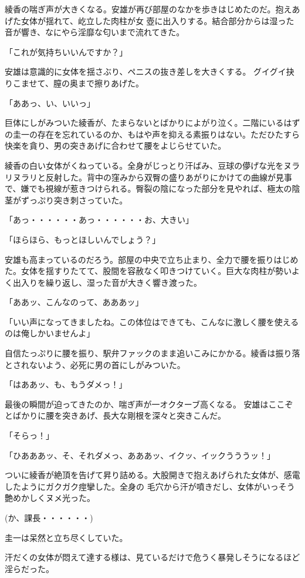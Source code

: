 ﻿\documentclass[book,tate]{jlreq}
\begin{document}
綾香の喘ぎ声が大きくなる。安雄が再び部屋のなかを歩きはじめたのだ。抱えあげた女体が揺れて、屹立した肉柱が女 壺に出入りする。結合部分からは湿った音が響き、なにやら淫靡な匂いまで流れてきた。

「これが気持ちいいんですか？」

安雄は意識的に女体を揺さぶり、ペニスの抜き差しを大きくする。 グイグイ抉りこませて、膣の奥まで擦りあげた。

「ああっ、い、いいっ」

巨体にしがみついた綾香が、たまらないとばかりによがり泣く。二階にいるはずの圭一の存在を忘れているのか、もはや声を抑える素振りはない。ただひたすら快楽を貪り、男の突きあげに合わせて腰をよじらせていた。

綾香の白い女体がくねっている。全身がじっとり汗ばみ、豆球の儚げな光をヌラリヌラリと反射した。背中の窪みから双臀の盛りあがりにかけての曲線が見事で、嫌でも視線が惹きつけられる。臀裂の陰になった部分を見やれば、極太の陰茎がずっぷり突き刺さっていた。

「あっ・・・・・・あっ・・・・・・お、大きい」

「ほらほら、もっとほしいんでしょう？」

安雄も高まっているのだろう。部屋の中央で立ち止まり、全力で腰を振りはじめた。女体を揺すりたてて、股間を容赦なく叩きつけていく。巨大な肉柱が勢いよく出入りを繰り返し、湿った音が大きく響き渡った。

「ああッ、こんなのって、あああッ」

「いい声になってきましたね。この体位はできても、こんなに激しく腰を使えるのは俺しかいませんよ」

自信たっぷりに腰を振り、駅弁ファックのまま追いこみにかかる。綾香は振り落とされないよう、必死に男の首にしがみついた。

「はああッ、も、もうダメっ！」

最後の瞬間が迫ってきたのか、喘ぎ声が一オクターブ高くなる。 安雄はここぞとばかりに腰を突きあげ、長大な剛根を深々と突きこんだ。

「そらっ！」

「ひあああッ、そ、それダメっ、あああッ、イクッ、イックうううッ！」

ついに綾香が絶頂を告げて昇り詰める。大股開きで抱えあげられた女体が、感電したようにガクガク痙攣した。全身の 毛穴から汗が噴きだし、女体がいっそう艶めかしくヌメ光った。

(か、課長・・・・・・)

圭一は呆然と立ち尽くしていた。

汗だくの女体が悶えて達する様は、見ているだけで危うく暴発しそうになるほど淫らだった。
\end{document}
